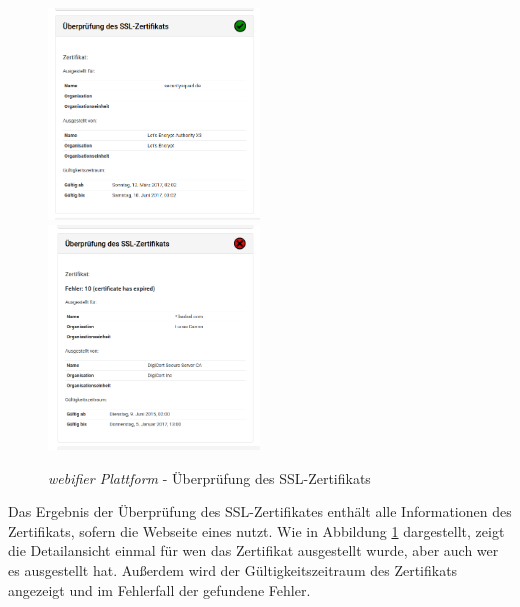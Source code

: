 \begin{figure}[H]
\centerline{%
\includegraphics[width=0.5\textwidth]{images/platform/certificatechecker-clean}%
\includegraphics[width=0.5\textwidth]{images/platform/certificatechecker-malicious}%
}%
\caption{\textit{webifier Plattform} - Überprüfung des SSL-Zertifikats}
\label{fig:platform-result-certificatechecker}
\end{figure}

Das Ergebnis der Überprüfung des SSL-Zertifikates enthält alle Informationen des Zertifikats, sofern die Webseite eines nutzt. Wie in Abbildung \ref{fig:platform-result-certificatechecker} dargestellt, zeigt die Detailansicht einmal für wen das Zertifikat ausgestellt wurde, aber auch wer es ausgestellt hat. Außerdem wird der Gültigkeitszeitraum des Zertifikats angezeigt und im Fehlerfall der gefundene Fehler.


